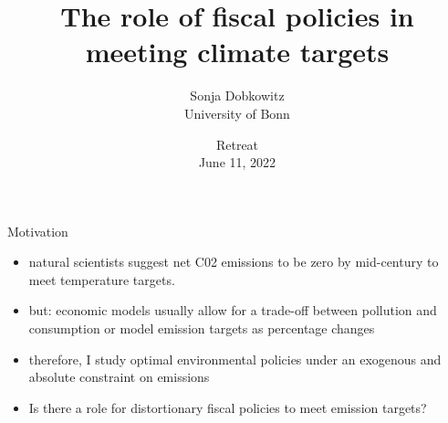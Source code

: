 \documentclass[11pt,aspectratio=169]{beamer}
\author[Sonja Dobkowitz]{\small Sonja Dobkowitz\\ \footnotesize{University of Bonn%
	}\\ }
\institute[University of Bonn]{}
\title{The role of fiscal policies in meeting climate targets}
\date{\small{Retreat\\ June 11, 2022 }}
\newcommand{\ar}{$\Rightarrow$ \ }
\begin{document}
	
	{
		\begin{frame}
		\titlepage
	\end{frame}
}



\begin{frame}{Motivation}

\begin{itemize}[<+-| alert@+>]
\item natural scientists suggest net C02 emissions to be zero by mid-century \citep{Rogelj2018MitigationDevelopment.} to meet temperature targets.
\vspace{3mm}
\item<+-> but: economic models usually allow for a trade-off between pollution and consumption or model emission targets as percentage changes %
\vspace{3mm}
\item<+-> therefore, I study optimal environmental policies under an exogenous and absolute constraint on emissions
\vspace{3mm}
\item<+-> Is there a role for distortionary fiscal policies to meet emission targets?
\end{itemize}
\end{frame}
\end{document}
